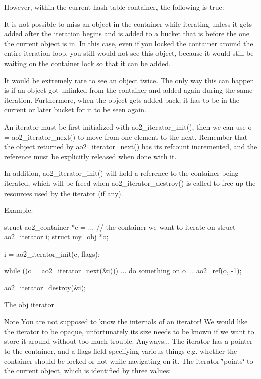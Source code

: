 However, within the current hash table container, the following is true:
\begin{DoxyItemize}
\item It is not possible to miss an object in the container while iterating unless it gets added after the iteration begins and is added to a bucket that is before the one the current object is in. In this case, even if you locked the container around the entire iteration loop, you still would not see this object, because it would still be waiting on the container lock so that it can be added.
\item It would be extremely rare to see an object twice. The only way this can happen is if an object got unlinked from the container and added again during the same iteration. Furthermore, when the object gets added back, it has to be in the current or later bucket for it to be seen again.
\end{DoxyItemize}

An iterator must be first initialized with ao2\_\-iterator\_\-init(), then we can use o = ao2\_\-iterator\_\-next() to move from one element to the next. Remember that the object returned by ao2\_\-iterator\_\-next() has its refcount incremented, and the reference must be explicitly released when done with it.

In addition, ao2\_\-iterator\_\-init() will hold a reference to the container being iterated, which will be freed when ao2\_\-iterator\_\-destroy() is called to free up the resources used by the iterator (if any).

Example:


\begin{DoxyCode}
  struct ao2_container *c = ... // the container we want to iterate on
  struct ao2_iterator i;
  struct my_obj *o;

  i = ao2_iterator_init(c, flags);

  while ((o = ao2_iterator_next(&i))) {
     ... do something on o ...
     ao2_ref(o, -1);
  }

  ao2_iterator_destroy(&i);
\end{DoxyCode}


The obj iterator \begin{DoxyNote}{Note}
You are not supposed to know the internals of an iterator! We would like the iterator to be opaque, unfortunately its size needs to be known if we want to store it around without too much trouble. Anyways... The iterator has a pointer to the container, and a flags field specifying various things e.g. whether the container should be locked or not while navigating on it. The iterator \char`\"{}points\char`\"{} to the current object, which is identified by three values:
\end{DoxyNote}

